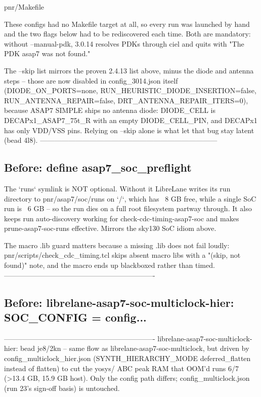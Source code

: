 \begin{relocated}{pnr/Makefile}
\begin{textblock}

These configs had no Makefile target at all, so every run was launched by
hand and the two flags below had to be rediscovered each time. Both are
mandatory: without --manual-pdk, 3.0.14 resolves PDKs through ciel and quits
with "The PDK asap7 was not found."

The --skip list mirrors the proven 2.4.13 list above, minus the diode and
antenna steps -- those are now disabled in config_3014.json itself
(DIODE_ON_PORTS=none, RUN_HEURISTIC_DIODE_INSERTION=false,
RUN_ANTENNA_REPAIR=false, DRT_ANTENNA_REPAIR_ITERS=0), because ASAP7 SIMPLE
ships no antenna diode: DIODE_CELL is DECAPx1_ASAP7_75t_R with an empty
DIODE_CELL_PIN, and DECAPx1 has only VDD/VSS pins. Relying on --skip alone
is what let that bug stay latent (bead 4l8).
---------------------------------------------------------------------------
\end{textblock}

\subsection*{Before: define asap7\_soc\_preflight}

\begin{textblock}

The `runs` symlink is NOT optional. Without it LibreLane writes its run
directory to pnr/asap7/soc/runs on `/`, which has ~8 GB free, while a single
SoC run is ~6 GB -- so the run dies on a full root filesystem partway
through. It also keeps run auto-discovery working for
check-cdc-timing-asap7-soc and makes prune-asap7-soc-runs effective.
Mirrors the sky130 SoC idiom above.

The macro .lib guard matters because a missing .lib does not fail loudly:
pnr/scripts/check_cdc_timing.tcl skips absent macro libs with a "(skip, not
found)" note, and the macro ends up blackboxed rather than timed.
----------------------------------------------------------------
\end{textblock}

\subsection*{Before: librelane-asap7-soc-multiclock-hier: SOC\_CONFIG = config...}

\begin{textblock}
----------------------------------------------------------------
librelane-asap7-soc-multiclock-hier: bead je8/2kn -- same flow as
librelane-asap7-soc-multiclock, but driven by config_multiclock_hier.json
(SYNTH_HIERARCHY_MODE deferred_flatten instead of flatten) to cut the yosys/
ABC peak RAM that OOM'd runs 6/7 (>13.4 GB, 15.9 GB host). Only the config
path differs; config_multiclock.json (run 23's sign-off basis) is untouched.


\end{textblock}
\end{relocated}

